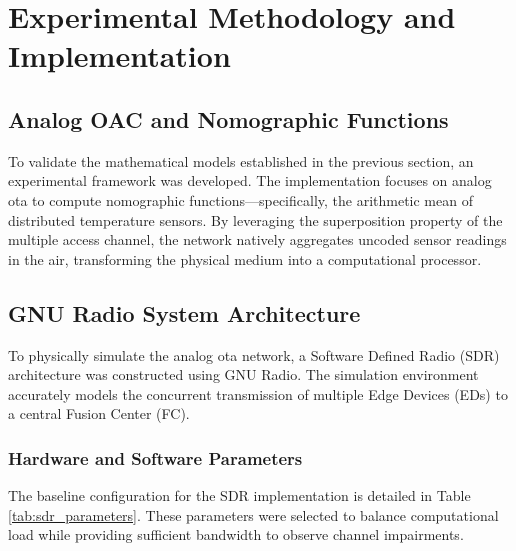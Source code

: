 \documentclass[Markos_Delaportas_1316.tex]{subfiles}
\begin{document}
    
    
    \section{Experimental Methodology and Implementation}
    
    \subsection{Analog OAC and Nomographic Functions}
        To validate the mathematical models established in the previous section, an experimental framework was developed. The implementation focuses on analog \gls{ota} to compute nomographic functions—specifically, the arithmetic mean of distributed temperature sensors. By leveraging the superposition property of the multiple access channel, the network natively aggregates uncoded sensor readings in the air, transforming the physical medium into a computational processor.
        
    \subsection{GNU Radio System Architecture}
        To physically simulate the analog \gls{ota} network, a Software Defined Radio (SDR) architecture was constructed using GNU Radio. The simulation environment accurately models the concurrent transmission of multiple Edge Devices (EDs) to a central Fusion Center (FC).
        
        \subsubsection{Hardware and Software Parameters}
        The baseline configuration for the SDR implementation is detailed in Table \ref{tab:sdr_parameters}. These parameters were selected to balance computational load while providing sufficient bandwidth to observe channel impairments.
        
\end{document}
